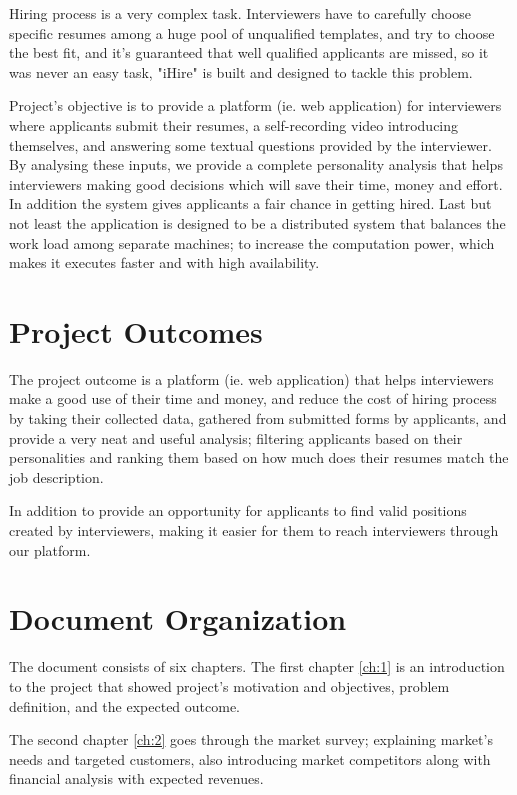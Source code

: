 Hiring process is a very complex task. Interviewers have to carefully choose specific resumes among a huge pool of unqualified templates, and try to choose the best fit, and it’s guaranteed that well qualified applicants are missed, so it was never an easy task, "iHire" is built and designed to tackle this problem.\newline

Project's objective is to provide a platform (ie. web application) for interviewers where applicants submit their resumes, a self-recording video introducing themselves, and answering some textual questions provided by the interviewer. By analysing these inputs, we provide a complete personality analysis that helps interviewers making good decisions which will save their time, money and effort. In addition the system gives applicants a fair chance in getting hired. Last but not least the application is designed to be a distributed system that balances the work load among separate machines; to increase the computation power, which makes it executes faster and with high availability.


\section{Project Outcomes}

The project outcome is a platform (ie. web application) that helps interviewers make a good use of their time and money, and reduce the cost of hiring process by taking their collected data, gathered from submitted forms by applicants, and provide a very neat and useful analysis; filtering applicants based on their personalities and ranking them based on how much does their resumes match the job description.

In addition to provide an opportunity for applicants to find valid positions created by interviewers, making it easier for them to reach interviewers through our platform.

\section{Document Organization}

The document consists of six chapters. The first chapter \ref{ch:1} is an introduction to the project that showed project's motivation and objectives, problem definition, and the expected outcome.\newline

The second chapter \ref{ch:2} goes through the market survey; explaining market's needs and targeted customers, also introducing market competitors along with financial analysis with expected revenues.\newline


